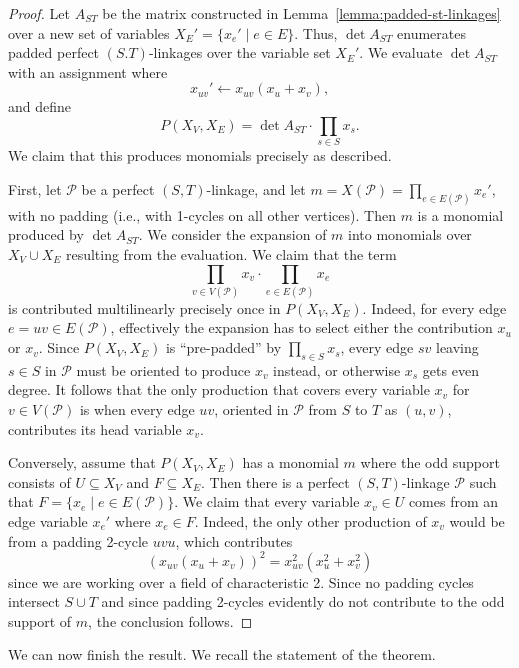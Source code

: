 \documentclass{theoretics}
\newcommand{\cP}{\ensuremath{\mathcal P}\xspace}
\begin{document}
\begin{proof}
  Let $A_{ST}$ be the matrix constructed in Lemma~\ref{lemma:padded-st-linkages}
  over a new set of variables $X_E'=\{x_e' \mid e \in E\}$.
  Thus, $\det A_{ST}$ enumerates padded perfect $(S.T)$-linkages
  over the variable set $X_E'$. We evaluate $\det A_{ST}$ with an
  assignment where
  \[
    x_{uv}' \gets x_{uv}(x_u+x_v),
  \]
  and define
  \[
    P(X_V,X_E) = \det A_{ST} \cdot \prod_{s \in S} x_s.
  \]
  We claim that this produces monomials precisely as described. 

  First, let $\cP$ be a perfect $(S,T)$-linkage, and let
  $m=X(\cP)=\prod_{e \in E(\cP)} x_e'$, with no padding (i.e., with
  1-cycles on all other vertices). Then $m$ is a monomial produced by
  $\det A_{ST}$. We consider the expansion of $m$ into monomials 
  over $X_V \cup X_E$ resulting from the evaluation.
  We claim that the term
  \[
    \prod_{v \in V(\cP)} x_v \cdot \prod_{e \in E(\cP)} x_e
  \]
  is contributed multilinearly precisely once in $P(X_V,X_E)$. 
  Indeed, for every edge $e=uv \in E(\cP)$, effectively the expansion
  has to select either the contribution $x_u$ or $x_v$. Since 
  $P(X_V,X_E)$ is ``pre-padded'' by $\prod_{s \in S} x_s$, 
  every edge $sv$ leaving $s \in S$ in $\cP$ must be oriented to
  produce $x_v$ instead, or otherwise $x_s$ gets even degree. 
  It follows that the only production that covers every variable
  $x_v$ for $v \in V(\cP)$ is when every edge $uv$, oriented in $\cP$
  from $S$ to $T$ as $(u,v)$, contributes its head variable $x_v$. 
  
  Conversely, assume that $P(X_V,X_E)$ has a monomial $m$ where the
  odd support consists of $U \subseteq X_V$ and $F \subseteq X_E$.
  Then there is a perfect $(S,T)$-linkage $\cP$ such that
  $F=\{x_e \mid e \in E(\cP)\}$. We claim that every variable
  $x_v \in U$ comes from an edge variable $x_e'$ where $x_e \in F$.
  Indeed, the only other production of $x_v$ would be from a padding
  2-cycle $uvu$, which contributes
  \[
    (x_{uv}(x_u+x_v))^2 = x_{uv}^2(x_u^2+x_v^2)
  \]
  since we are working over a field of characteristic 2. Since no
  padding cycles intersect $S \cup T$ and since padding 2-cycles
  evidently do not contribute to the odd support of $m$,
  the conclusion follows. 
\end{proof}

We can now finish the result. We recall the statement of the theorem.

\linkageframework*
\end{document}

